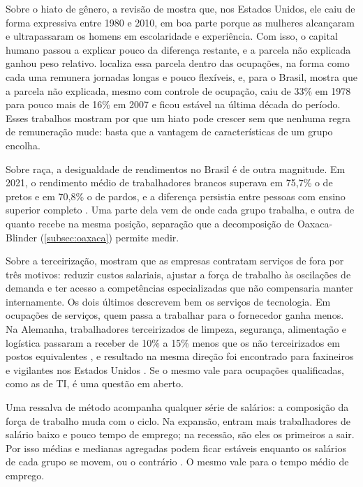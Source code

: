 Sobre o hiato de gênero, a revisão de  mostra que, nos Estados Unidos, ele caiu de forma expressiva entre 1980 e 2010, em boa parte porque as mulheres alcançaram e ultrapassaram os homens em escolaridade e experiência. Com isso, o capital humano passou a explicar pouco da diferença restante, e a parcela não explicada ganhou peso relativo.  localiza essa parcela dentro das ocupações, na forma como cada uma remunera jornadas longas e pouco flexíveis, e, para o Brasil,  mostra que a parcela não explicada, mesmo com controle de ocupação, caiu de 33\% em 1978 para pouco mais de 16\% em 2007 e ficou estável na última década do período. Esses trabalhos mostram por que um hiato pode crescer sem que nenhuma regra de remuneração mude: basta que a vantagem de características de um grupo encolha.

Sobre raça, a desigualdade de rendimentos no Brasil é de outra magnitude. Em 2021, o rendimento médio de trabalhadores brancos superava em 75,7\% o de pretos e em 70,8\% o de pardos, e a diferença persistia entre pessoas com ensino superior completo \cite{IBGE2022Desigualdades}. Uma parte dela vem de onde cada grupo trabalha, e outra de quanto recebe na mesma posição, separação que a decomposição de Oaxaca-Blinder (\autoref{subsec:oaxaca}) permite medir.

Sobre a terceirização,  mostram que as empresas contratam serviços de fora por três motivos: reduzir custos salariais, ajustar a força de trabalho às oscilações de demanda e ter acesso a competências especializadas que não compensaria manter internamente. Os dois últimos descrevem bem os serviços de tecnologia. Em ocupações de serviços, quem passa a trabalhar para o fornecedor ganha menos. Na Alemanha, trabalhadores terceirizados de limpeza, segurança, alimentação e logística passaram a receber de 10\% a 15\% menos que os não terceirizados em postos equivalentes \cite{GoldschmidtSchmieder2017}, e resultado na mesma direção foi encontrado para faxineiros e vigilantes nos Estados Unidos \cite{DubeKaplan2010}. Se o mesmo vale para ocupações qualificadas, como as de TI, é uma questão em aberto.

Uma ressalva de método acompanha qualquer série de salários: a composição da força de trabalho muda com o ciclo. Na expansão, entram mais trabalhadores de salário baixo e pouco tempo de emprego; na recessão, são eles os primeiros a sair. Por isso médias e medianas agregadas podem ficar estáveis enquanto os salários de cada grupo se movem, ou o contrário \cite{Solon1994}. O mesmo vale para o tempo médio de emprego.

